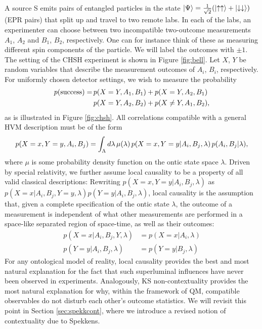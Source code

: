 A source S emits pairs of entangled particles in the state $\left|\Psi\right\rangle =\frac{1}{\sqrt{2}}(\ket{\uparrow\uparrow} +\ket{\downarrow\downarrow})$ (EPR pairs) that split up and travel to two remote labs. In each of the labs, an experimenter can choose between two incompatible two-outcome measurements $A_{1}$, $A_{2}$ and $B_{1}$, $B_{2}$, respectively. One can for instance think of these as measuring different spin components of the particle. We will label the outcomes with $\pm1$. The setting of the CHSH experiment is shown in Figure \ref{fig:bell}. Let $X$, $Y$ be random variables that describe the measurement outcomes of $A_i$, $B_i$, respectively. For uniformly chosen detector settings, we wish to measure the probability
\begin{equation*}
\begin{split}
p(\text{{success}}) =\thinspace & p(X=Y,A_1,B_1)+p(X=Y,A_2,B_1) \\
& p(X=Y,A_2,B_2)+p(X\neq Y,A_1,B_2),
\end{split}
\end{equation*}
as is illustrated in Figure \ref{fig:chsh}.
All correlations compatible with a general HVM description must be of the form
\begin{equation*}
p(X=x,Y=y,A_i,B_j)=\int_{\Lambda}d\lambda\thinspace\mu(\lambda)\,p(X=x,Y=y\vert A_i,B_j,\lambda)\,p(A_i,B_j\vert \lambda),
\end{equation*}
where $\mu$ is some probability density function on the ontic state space $\lambda$.
Driven by special relativity, we further assume local causality to be a property of all valid classical descriptions: Rewriting $p(X=x,Y=y \vert A_i,B_j,\lambda)$ as $p(X=x\vert A_i, B_j, Y=y, \lambda)p(Y=y\vert A_i,B_j,\lambda)$, local causality is the assumption that, given a complete specification of the ontic state $\lambda$, the outcome of a measurement is independent of what other measurements are performed in a space-like separated region of space-time, as well as their outcomes:
\begin{align*}
    p(X=x\vert A_i,B_j,Y,\lambda) & =p(X=x\vert A_i,\lambda) \\
    p(Y=y\vert A_i,B_j,\lambda) & =p(Y=y\vert B_j,\lambda)
\end{align*}
For any ontological model of reality, local causality provides the best and most natural explanation for the fact that such superluminal influences have never been observed in experiments. Analogously, KS non-contextuality provides the most natural explanation for why, within the framework of QM, compatible observables do not disturb each other's outcome statistics. We will revisit this point in Section \ref{sec:spekkcont}, where we introduce a revised notion of contextuality due to Spekkens.
